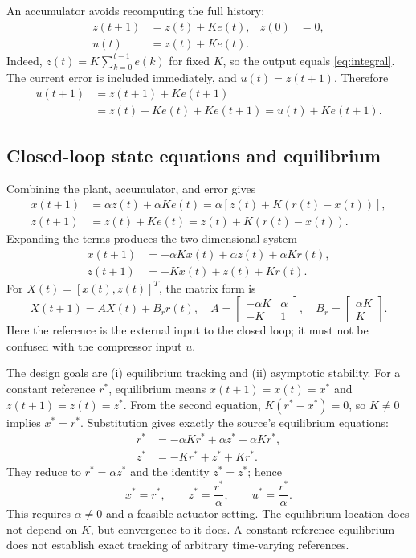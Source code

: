 \documentclass[11pt,a4paper]{article}
\numberwithin{equation}{section}
\numberwithin{figure}{section}
\numberwithin{table}{section}
\begin{document}
An accumulator avoids recomputing the full history:
\begin{align}\label{eq:controller}
z(t+1)&=z(t)+Ke(t),& z(0)&=0,\\
u(t)&=z(t)+Ke(t).\label{eq:controlleroutput}
\end{align}
Indeed, $z(t)=K\sum_{k=0}^{t-1}e(k)$ for fixed $K$, so the output equals \cref{eq:integral}. The current error is included immediately, and $u(t)=z(t+1)$. Therefore
\begin{align*}
u(t+1)&=z(t+1)+Ke(t+1)\\
&=z(t)+Ke(t)+Ke(t+1)=u(t)+Ke(t+1).
\end{align*}

\subsection{Closed-loop state equations and equilibrium}
Combining the plant, accumulator, and error gives
\begin{align*}
x(t+1)&=\alpha z(t)+\alpha Ke(t)
=\alpha[z(t)+K(r(t)-x(t))],\\
z(t+1)&=z(t)+Ke(t)=z(t)+K(r(t)-x(t)).
\end{align*}
Expanding the terms produces the two-dimensional system
\begin{align}
x(t+1)&=-\alpha Kx(t)+\alpha z(t)+\alpha Kr(t),\label{eq:closedx}\\
z(t+1)&=-Kx(t)+z(t)+Kr(t).\label{eq:closedz}
\end{align}
For $X(t)=[x(t),z(t)]^T$, the matrix form is
\begin{equation}\label{eq:closedmatrix}
X(t+1)=AX(t)+B_r r(t),\quad
A=\begin{bmatrix}-\alpha K&\alpha\\-K&1\end{bmatrix},\quad
B_r=\begin{bmatrix}\alpha K\\K\end{bmatrix}.
\end{equation}
Here the reference is the external input to the closed loop; it must not be confused with the compressor input $u$.

The design goals are (i) equilibrium tracking and (ii) asymptotic stability. For a constant reference $r^*$, equilibrium means $x(t+1)=x(t)=x^*$ and $z(t+1)=z(t)=z^*$. From the second equation, $K(r^*-x^*)=0$, so $K\ne0$ implies $x^*=r^*$. Substitution gives exactly the source's equilibrium equations:
\begin{align*}
r^*&=-\alpha Kr^*+\alpha z^*+\alpha Kr^*,\\
z^*&=-Kr^*+z^*+Kr^*.
\end{align*}
They reduce to $r^*=\alpha z^*$ and the identity $z^*=z^*$; hence
\begin{equation}\label{eq:eqpoint}x^*=r^*,\qquad z^*=\frac{r^*}{\alpha},\qquad u^*=\frac{r^*}{\alpha}.\end{equation}
This requires $\alpha\ne0$ and a feasible actuator setting. The equilibrium location does not depend on $K$, but convergence to it does. A constant-reference equilibrium does not establish exact tracking of arbitrary time-varying references.
\end{document}
